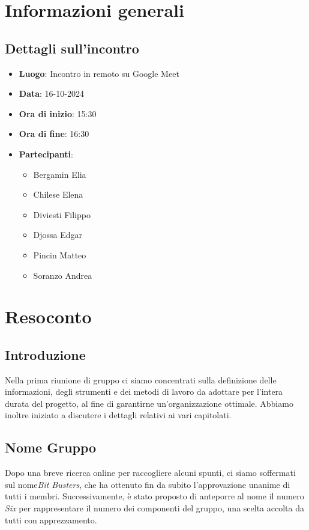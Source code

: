 \section{Informazioni generali}
\subsection{Dettagli sull'incontro}
\begin{itemize}
    \item \textbf{Luogo}: Incontro in remoto su Google Meet
    \item \textbf{Data}: 16-10-2024
    \item \textbf{Ora di inizio}: 15:30
    \item \textbf{Ora di fine}: 16:30
    \item \textbf{Partecipanti}:
    \begin{itemize}
        \item Bergamin Elia
        \item Chilese Elena
        \item Diviesti Filippo
        \item Djossa Edgar
        \item Pincin Matteo 
        \item Soranzo Andrea 
    \end{itemize}
\end{itemize}

\section{Resoconto}
\subsection{Introduzione}
    Nella prima riunione di gruppo ci siamo concentrati sulla definizione delle informazioni, degli strumenti e dei metodi di lavoro da adottare per l’intera durata del progetto, al fine di garantirne un’organizzazione ottimale. Abbiamo inoltre iniziato a discutere i dettagli relativi ai vari capitolati.
\subsection{Nome Gruppo}
    Dopo una breve ricerca online per raccogliere alcuni spunti, ci siamo soffermati sul nome\textit{Bit Busters}, che ha ottenuto fin da subito l’approvazione unanime di tutti i membri. Successivamente, è stato proposto di anteporre al nome il numero \textit{Six} per rappresentare il numero dei componenti del gruppo, una scelta accolta da tutti con apprezzamento.

